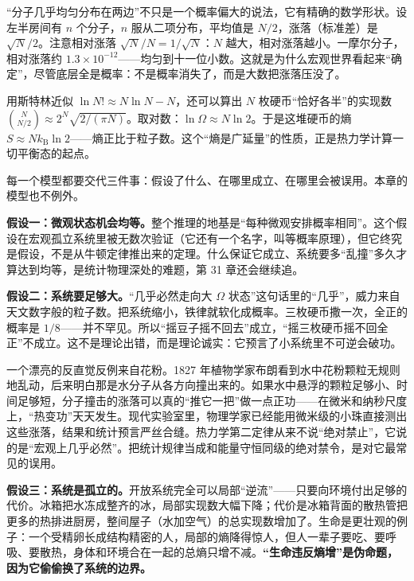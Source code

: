 \begin{challenge}
“分子几乎均匀分布在两边”不只是一个概率偏大的说法，它有精确的数学形状。设左半房间有 \(n\) 个分子，\(n\) 服从二项分布，平均值是 \(N/2\)，涨落（标准差）是 \(\sqrt{N}/2\)。注意相对涨落 \(\sqrt{N}/N=1/\sqrt{N}\)：\(N\) 越大，相对涨落越小。一摩尔分子，相对涨落约 \(1.3\times10^{-12}\)——均匀到十一位小数。这就是为什么宏观世界看起来“确定”，尽管底层全是概率：不是概率消失了，而是大数把涨落压没了。

用斯特林近似 \(\ln N!\approx N\ln N-N\)，还可以算出 \(N\) 枚硬币“恰好各半”的实现数 \(\binom{N}{N/2}\approx 2^{N}\sqrt{2/(\pi N)}\)。取对数：\(\ln\Omega\approx N\ln 2\)。于是这堆硬币的熵 \(S\approx N k_{\mathrm{B}}\ln 2\)——熵正比于粒子数。这个“熵是广延量”的性质，正是热力学计算一切平衡态的起点。
\end{challenge}


每一个模型都要交代三件事：假设了什么、在哪里成立、在哪里会被误用。本章的模型也不例外。

\textbf{假设一：微观状态机会均等。}整个推理的地基是“每种微观安排概率相同”。这个假设在宏观孤立系统里被无数次验证（它还有一个名字，叫等概率原理），但它终究是假设，不是从牛顿定律推出来的定理。什么保证它成立、系统要多“乱撞”多久才算达到均等，是统计物理深处的难题，第 31 章还会继续追。

\textbf{假设二：系统要足够大。}“几乎必然走向大 \(\Omega\) 状态”这句话里的“几乎”，威力来自天文数字般的粒子数。把系统缩小，铁律就软化成概率。三枚硬币撒一次，全正的概率是 \(1/8\)——并不罕见。所以“摇豆子摇不回去”成立，“摇三枚硬币摇不回全正”不成立。这不是理论出错，而是理论诚实：它预言了小系统里不可逆会破功。

一个漂亮的反直觉反例来自花粉。1827 年植物学家布朗看到水中花粉颗粒无规则地乱动，后来明白那是水分子从各方向撞出来的。如果水中悬浮的颗粒足够小、时间足够短，分子撞击的涨落可以真的“推它一把”做一点正功——在微米和纳秒尺度上，“热变功”天天发生。现代实验室里，物理学家已经能用微米级的小珠直接测出这些涨落，结果和统计预言严丝合缝。热力学第二定律从来不说“绝对禁止”，它说的是“宏观上几乎必然”。把统计规律当成和能量守恒同级的绝对禁令，是对它最常见的误用。

\textbf{假设三：系统是孤立的。}开放系统完全可以局部“逆流”——只要向环境付出足够的代价。冰箱把水冻成整齐的冰，局部实现数大幅下降；代价是冰箱背面的散热管把更多的热排进厨房，整间屋子（水加空气）的总实现数增加了。生命是更壮观的例子：一个受精卵长成结构精密的人，局部的熵降得惊人，但人一辈子要吃、要呼吸、要散热，身体和环境合在一起的总熵只增不减。\textbf{“生命违反熵增”是伪命题，因为它偷偷换了系统的边界。}

